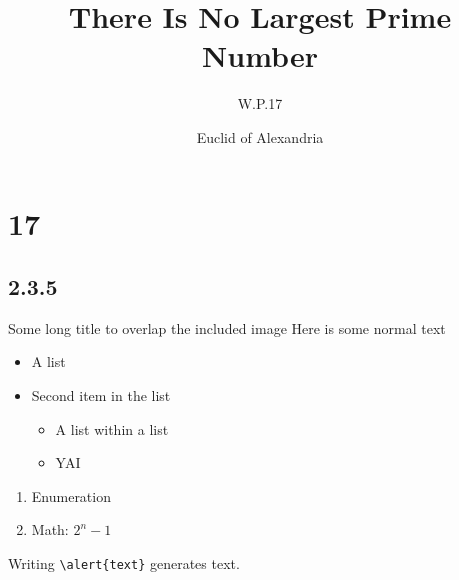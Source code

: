 \documentclass[aspectratio=169]{beamer}
\begin{document}
\title{There Is No Largest Prime Number}
\subtitle{W.P.17}
\date{}
\author{Euclid of Alexandria}

\begin{frame}
	\titlepage
\end{frame}

\section{17}
\subsection{2.3.5}

\begin{frame}{Some long title to overlap the included image}
	Here is some normal text
	\begin{itemize}
		\item A list 
		\item Second item in the list
		\begin{itemize}
			\item A list within a list
			\item YAI
		\end{itemize}
	\end{itemize}
	\vfill
	\begin{enumerate}
		\item Enumeration\
		\item Math: $2^n-1$
	\end{enumerate}
	\vfill
	Writing \texttt{\textbackslash alert\{text\}} generates \alert{text}.	

\end{frame}
\end{document}
